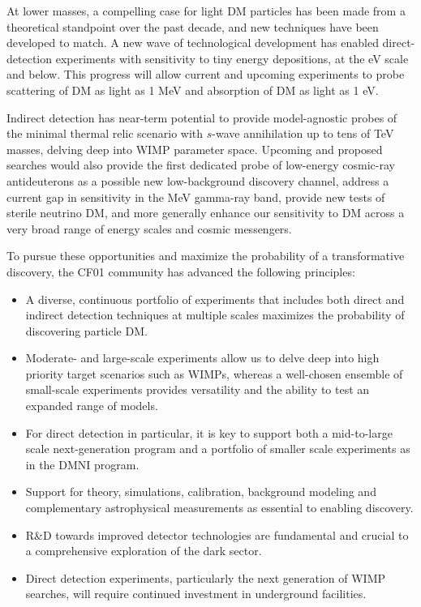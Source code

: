 \documentclass[nofootinbib]{article}
\begin{document}
At lower masses, a compelling case for light DM particles has been made from a theoretical standpoint over the past decade,
and new techniques have been developed to match. A new wave of technological development has enabled direct-detection experiments with sensitivity to tiny energy depositions, at the eV scale and below. This progress will allow current and upcoming experiments to probe scattering of DM as light as 1 MeV and absorption of DM as light as 1 eV.

Indirect detection has near-term potential to provide model-agnostic probes of the minimal thermal relic scenario with $s$-wave annihilation up to tens of TeV masses, delving deep into WIMP parameter space. Upcoming and proposed searches would also provide the first dedicated probe of low-energy cosmic-ray antideuterons as a possible new low-background discovery channel, address a current gap in sensitivity in the MeV gamma-ray band, provide new tests of sterile neutrino DM, and more generally enhance our sensitivity to DM across a very broad range of energy scales and cosmic messengers.

To pursue these opportunities and maximize the probability of a transformative discovery, the CF01 community has advanced the following principles:

\begin{itemize} 
\item A diverse, continuous portfolio of experiments that includes both direct and indirect detection techniques at multiple scales maximizes the probability of discovering particle DM.
\item Moderate- and large-scale experiments allow us to delve deep into high priority target scenarios such as WIMPs, whereas a well-chosen ensemble of small-scale experiments provides versatility and the ability to test an expanded range of models. 
\item For direct detection in particular, it is key to support both a mid-to-large scale next-generation program and a portfolio of smaller scale experiments as in the DMNI program.
\item Support for theory, simulations, calibration, background modeling and complementary astrophysical measurements as essential to enabling discovery. 
\item R\&D towards improved detector technologies are fundamental and crucial to a comprehensive exploration of the dark sector.
\item Direct detection experiments, particularly the next generation of WIMP searches, will require continued investment in underground facilities.
\end{itemize}
\end{document}
